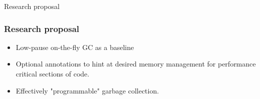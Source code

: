 \begin{frame}
    \begin{center}
        {\LARGE Research proposal}
    \end{center}
\end{frame}

\begin{frame}
    \frametitle{Research proposal}
    \begin{itemize}
        \item Low-pause on-the-fly GC as a baseline
        \item Optional annotations to hint at desired memory
              management for performance critical sections of code.
        \item Effectively "programmable" garbage collection.
    \end{itemize}
\end{frame}
